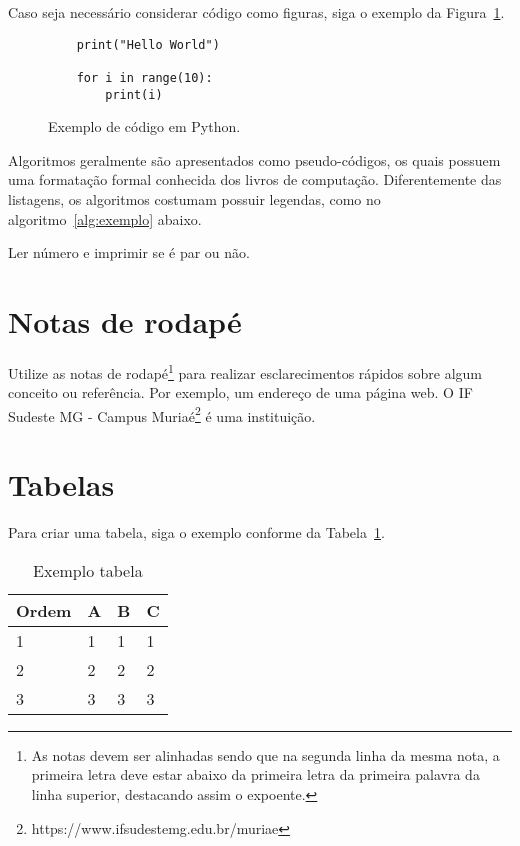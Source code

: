 Caso seja necessário considerar código como figuras, siga o exemplo da Figura~\ref{fig:codigo_python}.

\begin{figure}[H] %
\centering   
\caption{Exemplo de código em Python.}    
\begin{verbatim}
    print("Hello World")

    for i in range(10):
        print(i)
\end{verbatim}
\label{fig:codigo_python}
\end{figure}

Algoritmos geralmente são apresentados como pseudo-códigos, os quais possuem uma formatação formal conhecida dos livros de computação. Diferentemente das listagens, os algoritmos costumam possuir legendas, como no algoritmo~\ref{alg:exemplo} abaixo.
\begin{algorithm*}
 \caption{Ler número e imprimir se é par ou não.}
    \label{alg:exemplo}
\end{algorithm*}

\section{Notas de rodapé}

Utilize as notas de rodapé\footnote{As notas devem ser alinhadas sendo que na segunda linha da mesma nota, a primeira letra deve estar abaixo da primeira letra da primeira palavra da linha superior, destacando assim o expoente.} para realizar esclarecimentos rápidos sobre algum conceito ou referência. Por exemplo, um endereço de uma página web. O IF Sudeste MG - Campus Muriaé\footnote{https://www.ifsudestemg.edu.br/muriae} é uma instituição.

\section{Tabelas}
Para criar uma tabela, siga o exemplo conforme da Tabela~\ref{tb:exemplo_tabela}.

\begin{table}[!ht]
     \caption{Exemplo tabela}\label{tb:exemplo_tabela}
	\centering
	{\footnotesize
    \begin{tabular}{|l|l|l|l|}
    \hline
        \textbf{Ordem} & \textbf{A} & \textbf{B} & \textbf{C} \\ \hline
        1 & 1 & 1 & 1 \\ \hline
        2 & 2 & 2 & 2 \\ \hline
        3 & 3 & 3 & 3 \\ \hline
    \end{tabular}
    }
\end{table}


